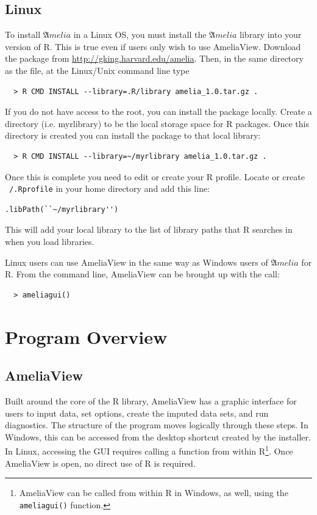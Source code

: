 \documentclass[12pt,titlepage]{article}
\newcommand{\Amelia}{\ensuremath{\mathfrak Amelia} }
\begin{document}
\subsection{Linux}
\label{sec:lin-install}
To install ${\mathfrak Amelia}$ in a Linux OS, you must install the
${\mathfrak Amelia}$ library into your version of R.  This is true
even if users only wish to use AmeliaView.  Download the package from
\url{http://gking.harvard.edu/amelia}.  Then, in the same directory as
the file, at the Linux/Unix command line type
  \begin{verbatim}
  > R CMD INSTALL --library=.R/library amelia_1.0.tar.gz .
  \end{verbatim}
If you do not have access to the root, you can install the package
locally.  Create a directory (i.e. myrlibrary) to be the local storage
space for R packages.  Once this directory is created you can install
the package to that local library:
  \begin{verbatim}
  > R CMD INSTALL --library=~/myrlibrary amelia_1.0.tar.gz .
  \end{verbatim}
Once this is complete you need to edit or create your R profile.
Locate or create \texttt{~/.Rprofile} in your home directory and add
this line:
\begin{verbatim}
.libPath(``~/myrlibrary'')
\end{verbatim}
This will add your local library to the list of library paths that R
searches in when you load libraries.

Linux users can use AmeliaView in the same way as Windows users of
\Amelia for R.  From the command line, AmeliaView can be brought up
with the call:
  \begin{verbatim}
  > ameliagui()
  \end{verbatim}

\section{Program Overview}
\label{sec:overview}

\subsection{AmeliaView}
\label{sec:guioverview}
Built around the core of the R library, AmeliaView has a graphic
interface for users to input data, set options, create the imputed
data sets, and run diagnostics.  The structure of the program moves
logically through these steps.  In Windows, this can be accessed from
the desktop shortcut created by the installer.  In Linux, accessing
the GUI requires calling a function from within R\footnote{AmeliaView
  can be called from within R in Windows, as well, using the
  \texttt{ameliagui()} function.}.  Once AmeliaView is open, no direct
use of R is required.
\end{document}
